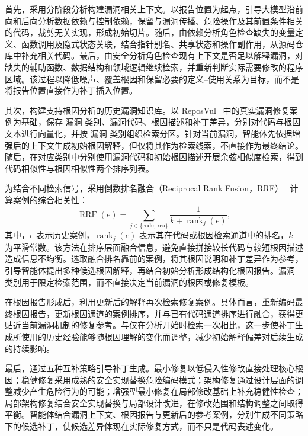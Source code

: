 首先，采用分阶段分析构建漏洞相关上下文。以报告位置为起点，引导大模型沿前向和后向分析数据依赖与控制依赖，保留与漏洞传播、危险操作及其前置条件相关的代码，裁剪无关实现，形成初始切片。随后，由依赖分析角色检查缺失的变量定义、函数调用及隐式状态关联，结合指针别名、共享状态和操作副作用，从源码仓库中补充相关代码。最后，由安全分析角色检查现有上下文是否足以解释漏洞，对缺失的辅助函数、数据结构和领域逻辑继续检索，并重新判断实际需要修改的程序区域。该过程以降低噪声、覆盖根因和保留必要的定义--使用关系为目标，而不是将报告位置直接作为补丁插入位置。

其次，构建支持根因分析的历史漏洞知识库。以 ReposVul~\cite{wang2024reposvul} 中的真实漏洞修复案例为基础，保存 漏洞 类别、漏洞代码、根因描述和补丁差异，分别对代码与根因文本进行向量化，并按 漏洞 类别组织检索分区。针对当前漏洞，智能体先依据增强后的上下文生成初始根因解释，但仅将其作为检索线索，不直接作为最终结论。随后，在对应类别中分别使用漏洞代码和初始根因描述开展余弦相似度检索，得到代码相似性与根因相似性两个排序列表。

为结合不同检索信号，采用倒数排名融合（Reciprocal Rank Fusion，RRF）~\cite{cormack2009rrf} 计算案例的综合相关性：
\begin{equation}
    \operatorname{RRF}(e)
    =
    \sum_{j \in \{\mathrm{code},\,\mathrm{rca}\}}
    \frac{1}{k + \operatorname{rank}_{j}(e)},
    \label{eq:repair-rrf}
\end{equation}
其中，$e$ 表示历史案例，$\operatorname{rank}_{j}(e)$ 表示其在代码或根因检索通道中的排名，$k$ 为平滑常数。该方法在排序层面融合信息，避免直接拼接较长代码与较短根因描述造成信息不均衡。选取融合排名靠前的案例，将其根因说明和补丁差异作为参考，引导智能体提出多种候选根因解释，再结合初始分析形成结构化根因报告。漏洞 类别用于限定检索范围，而不直接决定当前漏洞的根因或修复模板。

在根因报告形成后，利用更新后的解释再次检索修复案例。具体而言，重新编码最终根因报告，更新根因通道的案例排序，并与已有代码通道排序进行融合，获得更贴近当前漏洞机制的修复参考。与仅在分析开始时检索一次相比，这一步使补丁生成所使用的历史经验能够随根因理解的变化而调整，减少初始解释偏差对后续生成的持续影响。

最后，通过五种互补策略引导补丁生成。最小修复以低侵入性修改直接处理核心根因；稳健修复采用成熟的安全实现替换危险编码模式；架构修复通过设计层面的调整减少产生危险行为的可能；增强型最小修复在局部修改基础上补充稳健性检查；局部架构修复结合安全实现替换与局部设计改进，在修改范围和结构调整之间取得平衡。智能体结合漏洞上下文、根因报告与更新后的参考案例，分别生成不同策略下的候选补丁，使候选差异体现在实际修复方式，而不只是代码表述变化。

